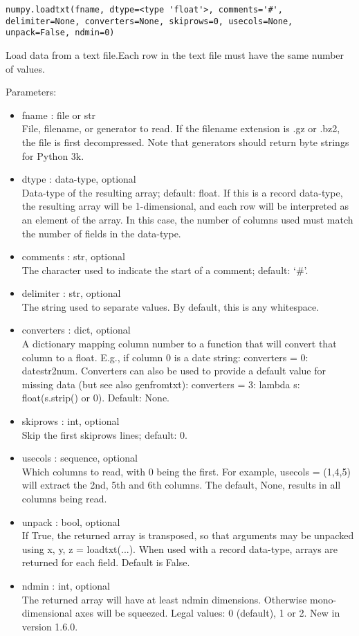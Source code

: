 \verb|numpy.loadtxt(fname, dtype=<type 'float'>, comments='#', delimiter=None, converters=None, skiprows=0, usecols=None, unpack=False, ndmin=0)|

Load data from a text file.Each row in the text file must have the same number of values.

Parameters:
\begin{itemize}
\item
fname : file or str\\
File, filename, or generator to read. If the filename extension is .gz or .bz2, the file is first decompressed. Note that generators should return byte strings for Python 3k.
\item
dtype : data-type, optional\\
Data-type of the resulting array; default: float. If this is a record data-type, the resulting array will be 1-dimensional, and each row will be interpreted as an element of the array. In this case, the number of columns used must match the number of fields in the data-type.
\item
comments : str, optional\\
The character used to indicate the start of a comment; default: ‘\#’.
\item
delimiter : str, optional\\
The string used to separate values. By default, this is any whitespace.
\item
converters : dict, optional\\
A dictionary mapping column number to a function that will convert that column to a float. E.g., if column 0 is a date string: converters = {0: datestr2num}. Converters can also be used to provide a default value for missing data (but see also genfromtxt): converters = {3: lambda s: float(s.strip() or 0)}. Default: None.
\item
skiprows : int, optional\\
Skip the first skiprows lines; default: 0.
\item
usecols : sequence, optional\\
Which columns to read, with 0 being the first. For example, usecols = (1,4,5) will extract the 2nd, 5th and 6th columns. The default, None, results in all columns being read.
\item
unpack : bool, optional\\
If True, the returned array is transposed, so that arguments may be unpacked using x, y, z = loadtxt(...). When used with a record data-type, arrays are returned for each field. Default is False.
\item
ndmin : int, optional\\
The returned array will have at least ndmin dimensions. Otherwise mono-dimensional axes will be squeezed. Legal values: 0 (default), 1 or 2.
New in version 1.6.0.
\end{itemize}

